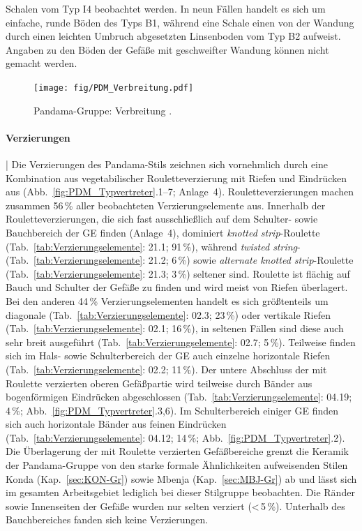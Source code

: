 Schalen vom Typ I4 beobachtet werden. In neun Fällen handelt es sich um einfache, runde Böden des Typs B1, während eine Schale einen von der Wandung durch einen leichten Umbruch abgesetzten Linsenboden vom Typ B2 aufweist. Angaben zu den Böden der Gefäße mit geschweifter Wandung können nicht gemacht werden.

\begin{figure}[p]
	\centering
	\texttt{[image: fig/PDM\_Verbreitung.pdf]}
	\caption{Pandama-Gruppe: Verbreitung \parencite[P1 nach][114 Abb.~42]{Gillet.2013}.}
	\label{fig:PDM_Verbreitung}
\end{figure}

\paragraph{Verzierungen}\hspace{-.5em}|\hspace{.5em}%
Die Verzierungen des Pandama-Stils zeichnen sich vornehmlich durch eine Kombination aus vegetabilischer Rouletteverzierung mit Riefen und Eindrücken aus (Abb.~\ref{fig:PDM_Typvertreter}.1--7; Anlage~4). Rouletteverzierungen machen zusammen 56\,\% aller beobachteten Verzierungselemente aus. Innerhalb der Rouletteverzierungen, die sich fast ausschließlich auf dem Schulter- sowie Bauchbereich der GE finden (Anlage~4), dominiert \textit{knotted strip}-Roulette (Tab.~\ref{tab:Verzierungselemente}: 21.1; 91\,\%), während \textit{twisted string}- (Tab.~\ref{tab:Verzierungselemente}: 21.2; 6\,\%) sowie \textit{alternate knotted strip}-Roulette (Tab.~\ref{tab:Verzierungselemente}: 21.3; 3\,\%) seltener sind. \mbox{Roulette} ist flächig auf Bauch und Schulter der Gefäße zu finden und wird meist von Riefen überlagert. Bei den anderen 44\,\% Verzierungselementen handelt es sich größtenteils um diagonale (Tab.~\ref{tab:Verzierungselemente}: 02.3; 23\,\%) oder vertikale Riefen (Tab.~\ref{tab:Verzierungselemente}: 02.1; 16\,\%), in seltenen Fällen sind diese auch sehr breit ausgeführt (Tab.~\ref{tab:Verzierungselemente}: 02.7; 5\,\%). Teilweise finden sich im Hals- sowie Schulterbereich der GE auch einzelne horizontale Riefen (Tab.~\ref{tab:Verzierungselemente}: 02.2; 11\,\%). Der untere Abschluss der mit \mbox{Roulette} verzierten oberen Gefäßpartie wird teilweise durch Bänder aus bogenförmigen Eindrücken abgeschlossen (Tab.~\ref{tab:Verzierungselemente}: 04.19; 4\,\%; Abb.~\ref{fig:PDM_Typvertreter}.3,6). Im Schulterbereich einiger GE finden sich auch horizontale Bänder aus feinen Eindrücken (Tab.~\ref{tab:Verzierungselemente}: 04.12; 14\,\%; Abb.~\ref{fig:PDM_Typvertreter}.2). Die Überlagerung der mit \mbox{Roulette} verzierten Gefäßbereiche grenzt die Keramik der Pandama-Gruppe von den starke formale Ähnlichkeiten aufweisenden Stilen Konda (Kap.~\ref{sec:KON-Gr}) sowie Mbenja (Kap.~\ref{sec:MBJ-Gr}) ab und lässt sich im gesamten Arbeitsgebiet lediglich bei dieser Stilgruppe beobachten. Die Ränder sowie Innenseiten der Gefäße wurden nur selten verziert (\textless\,5\,\%). Unterhalb des Bauchbereiches fanden sich keine Verzierungen.


